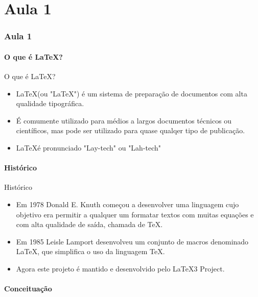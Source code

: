 
\part{Aula 1}
\section{Aula 1}

\subsection{O que é \LaTeX?}

\begin{frame}{O que é \LaTeX?}
    \begin{itemize}
    \item \LaTeX (ou "LaTeX") é um sistema de preparação de documentos com alta qualidade tipográfica.
    \item É comumente utilizado para médios a largos documentos técnicos ou científicos, mas pode ser utilizado para quase qualqer tipo de publicação.
    \item \LaTeX é pronunciado "Lay-tech" ou "Lah-tech"
    \end{itemize}
\end{frame}

\subsection{Histórico}

\begin{frame}{Histórico}
    \begin{itemize}
    \item Em 1978 Donald E. Knuth começou a desenvolver uma linguagem cujo objetivo era permitir a qualquer um formatar textos com muitas equações e com alta qualidade de saída, chamada de \TeX.
    \item Em 1985 Leisle Lamport desenvolveu um conjunto de macros denominado \LaTeX, que simplifica o uso da linguagem \TeX.
    \item Agora este projeto é mantido e desenvolvido pelo \LaTeX3 Project.
    \end{itemize}
\end{frame}

\subsection{Conceituação}

